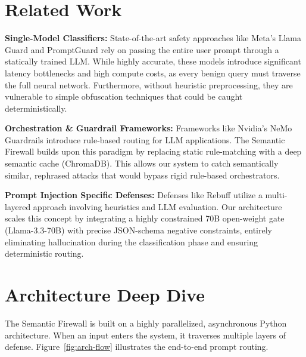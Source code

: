 \documentclass[12pt,a4paper]{article}
\begin{document}
\section{Related Work}

\textbf{Single-Model Classifiers:} State-of-the-art safety approaches like Meta's Llama Guard \cite{llamaguard} and PromptGuard \cite{promptguard} rely on passing the entire user prompt through a statically trained LLM. While highly accurate, these models introduce significant latency bottlenecks and high compute costs, as every benign query must traverse the full neural network. Furthermore, without heuristic preprocessing, they are vulnerable to simple obfuscation techniques that could be caught deterministically.

\textbf{Orchestration \& Guardrail Frameworks:} Frameworks like Nvidia's NeMo Guardrails \cite{nemoguardrails} introduce rule-based routing for LLM applications. The Semantic Firewall builds upon this paradigm by replacing static rule-matching with a deep semantic cache (ChromaDB). This allows our system to catch semantically similar, rephrased attacks that would bypass rigid rule-based orchestrators.

\textbf{Prompt Injection Specific Defenses:} Defenses like Rebuff \cite{rebuff} utilize a multi-layered approach involving heuristics and LLM evaluation. Our architecture scales this concept by integrating a highly constrained 70B open-weight gate (Llama-3.3-70B) with precise JSON-schema negative constraints, entirely eliminating hallucination during the classification phase and ensuring deterministic routing.

\section{Architecture Deep Dive}

The Semantic Firewall is built on a highly parallelized, asynchronous Python architecture. When an input enters the system, it traverses multiple layers of defense. Figure~\ref{fig:arch-flow} illustrates the end-to-end prompt routing.
\end{document}
